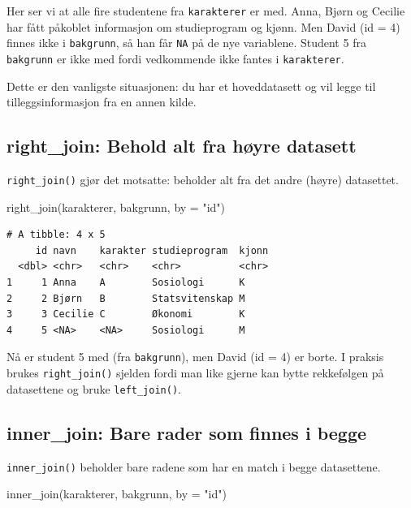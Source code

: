 \documentclass[
  norsk,
  letterpaper,
  DIV=11,
  numbers=noendperiod]{scrreprt}
\newenvironment{Shaded}{\begin{snugshade}}{\end{snugshade}}
\newcommand{\AttributeTok}[1]{\textcolor[rgb]{0.40,0.45,0.13}{#1}}
\newcommand{\FunctionTok}[1]{\textcolor[rgb]{0.28,0.35,0.67}{#1}}
\newcommand{\NormalTok}[1]{\textcolor[rgb]{0.00,0.23,0.31}{#1}}
\newcommand{\StringTok}[1]{\textcolor[rgb]{0.13,0.47,0.30}{#1}}
\theoremstyle{definition}
\theoremstyle{remark}
\begin{document}
Her ser vi at alle fire studentene fra \texttt{karakterer} er med. Anna,
Bjørn og Cecilie har fått påkoblet informasjon om studieprogram og
kjønn. Men David (id = 4) finnes ikke i \texttt{bakgrunn}, så han får
\texttt{NA} på de nye variablene. Student 5 fra \texttt{bakgrunn} er
ikke med fordi vedkommende ikke fantes i \texttt{karakterer}.

Dette er den vanligste situasjonen: du har et hoveddatasett og vil legge
til tilleggsinformasjon fra en annen kilde.

\subsection{right\_join: Behold alt fra høyre
datasett}\label{right_join-behold-alt-fra-huxf8yre-datasett}

\texttt{right\_join()} gjør det motsatte: beholder alt fra det andre
(høyre) datasettet.

\begin{Shaded}
\begin{Highlighting}[]
\FunctionTok{right\_join}\NormalTok{(karakterer, bakgrunn, }\AttributeTok{by =} \StringTok{"id"}\NormalTok{)}
\end{Highlighting}
\end{Shaded}

\begin{verbatim}
# A tibble: 4 x 5
     id navn    karakter studieprogram  kjonn
  <dbl> <chr>   <chr>    <chr>          <chr>
1     1 Anna    A        Sosiologi      K    
2     2 Bjørn   B        Statsvitenskap M    
3     3 Cecilie C        Økonomi        K    
4     5 <NA>    <NA>     Sosiologi      M    
\end{verbatim}

Nå er student 5 med (fra \texttt{bakgrunn}), men David (id = 4) er
borte. I praksis brukes \texttt{right\_join()} sjelden fordi man like
gjerne kan bytte rekkefølgen på datasettene og bruke
\texttt{left\_join()}.

\subsection{inner\_join: Bare rader som finnes i
begge}\label{inner_join-bare-rader-som-finnes-i-begge}

\texttt{inner\_join()} beholder bare radene som har en match i begge
datasettene.

\begin{Shaded}
\begin{Highlighting}[]
\FunctionTok{inner\_join}\NormalTok{(karakterer, bakgrunn, }\AttributeTok{by =} \StringTok{"id"}\NormalTok{)}
\end{Highlighting}
\end{Shaded}
\end{document}
